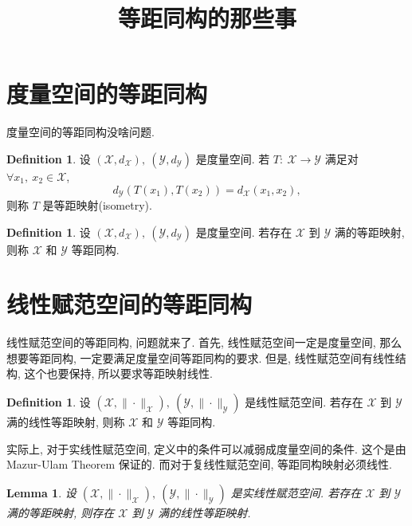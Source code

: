 \documentclass[a4paper,11pt]{article}
\title{等距同构的那些事}
\newtheorem{lemma}[theorem]{Lemma}
\theoremstyle{definition}
\newtheorem{definition}[theorem]{Definition}
\begin{document}
\begin{CJK*}{UTF8}{gbsn}

\maketitle

\section{度量空间的等距同构}

度量空间的等距同构没啥问题.

\begin{definition}
    设 $ (\mathscr{X}, d_{\mathscr{X}}),\ (\mathscr{Y}, d_{\mathscr{Y}}) $ 是度量空间.
    若 $ T :\ \mathscr{X} \to \mathscr{Y} $ 满足对 $ \forall x_1,\ x_2 \in \mathscr{X} $,
    $$
        d_{\mathscr{Y}} (T(x_1), T(x_2)) = d_{\mathscr{X}} (x_1, x_2),
    $$
    则称 $ T $ 是等距映射(isometry).
\end{definition}

\begin{definition}
    设 $ (\mathscr{X}, d_{\mathscr{X}}),\ (\mathscr{Y}, d_{\mathscr{Y}}) $ 是度量空间.
    若存在 $ \mathscr{X} $ 到 $ \mathscr{Y} $ 满的等距映射, 则称 $ \mathscr{X} $ 和 $ \mathscr{Y} $ 等距同构.
\end{definition}

\section{线性赋范空间的等距同构}

线性赋范空间的等距同构, 问题就来了. 首先, 线性赋范空间一定是度量空间, 
那么想要等距同构, 一定要满足度量空间等距同构的要求.
但是, 线性赋范空间有线性结构, 这个也要保持, 所以要求等距映射线性.

\begin{definition}
    设 $ (\mathscr{X}, \| \cdot \|_\mathscr{X}),\ (\mathscr{Y}, \| \cdot \|_\mathscr{Y}) $ 是线性赋范空间.
    若存在 $ \mathscr{X} $ 到 $ \mathscr{Y} $ 满的线性等距映射, 则称 $ \mathscr{X} $ 和 $ \mathscr{Y} $ 等距同构.
\end{definition}

实际上, 对于实线性赋范空间, 定义中的条件可以减弱成度量空间的条件.
这个是由 Mazur-Ulam Theorem 保证的. 而对于复线性赋范空间, 等距同构映射必须线性.

\begin{lemma}  \label{1}
    设 $ (\mathscr{X}, \| \cdot \|_\mathscr{X}),\ (\mathscr{Y}, \| \cdot \|_\mathscr{Y}) $ 是实线性赋范空间.
    若存在 $ \mathscr{X} $ 到 $ \mathscr{Y} $ 满的等距映射, 则存在 $ \mathscr{X} $ 到 $ \mathscr{Y} $ 满的线性等距映射.
\end{lemma}


\end{CJK*}
\end{document}
